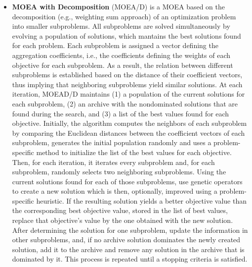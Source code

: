 \begin{itemize}
	\item \textbf{\ac{MOEA} with Decomposition} (MOEA/D) \cite{Zhang2007MOEAD} is a \ac{MOEA} based on the decomposition (e.g., weighting sum approach) of an optimization problem into smaller subproblems. All subproblems are solved simultaneously by evolving a population of solutions, which mantains the best solutions found for each problem. Each subproblem is assigned a vector defining the aggregation coefficients, i.e., the coefficients defining the weights of each objective for each subproblem. As a result, the relation between different subproblems is established based on the distance of their coefficient vectors, thus implying that neighboring subproblems yield similar solutions. At each iteration, MOEAD/D maintains (1) a population of the current solutions for each subproblem, (2) an archive with the nondominated solutions that are found during the search, and (3) a list of the best values found for each objective. Initially, the algorithm computes the neighbors of each subproblem by comparing the Euclidean distances between the coefficient vectors of each subproblem, generates the initial population randomly and uses a problem-specific method to initialize the list of the best values for each objective. Then, for each iteration, it iterates every subproblem and, for each subproblem, randomly selects two neighboring subproblems. Using the current solutions found for each of those subproblems, use genetic operators to create a new solution which is then, optionally, improved using a problem-specific heuristic. If the resulting solution yields a better objective value than the corresponding best objective value, stored in the list of best values, replace that objective's value by the one obtained with the new solution. After determining the solution for one subproblem, update the information in other subproblems, and, if no archive solution dominates the newly created solution, add it to the archive and remove any solution in the archive that is dominated by it. This process is repeated until a stopping criteria is satisfied.
	

\end{itemize}
